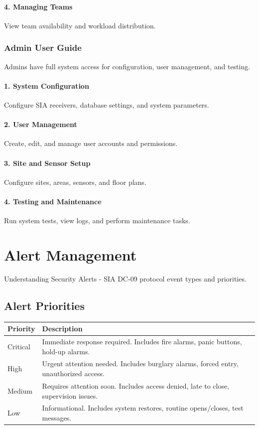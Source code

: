 \documentclass[12pt,a4paper]{article}
\begin{document}
\paragraph{4. Managing Teams}
View team availability and workload distribution.

\subsubsection{Admin User Guide}
Admins have full system access for configuration, user management, and testing.

\paragraph{1. System Configuration}
Configure SIA receivers, database settings, and system parameters.

\paragraph{2. User Management}
Create, edit, and manage user accounts and permissions.

\paragraph{3. Site and Sensor Setup}
Configure sites, areas, sensors, and floor plans.

\paragraph{4. Testing and Maintenance}
Run system tests, view logs, and perform maintenance tasks.

\section{Alert Management}

Understanding Security Alerts - SIA DC-09 protocol event types and priorities.

\subsection{Alert Priorities}

\begin{tabular}{|l|l|}
\hline
\textbf{Priority} & \textbf{Description} \\
\hline
Critical & Immediate response required. Includes fire alarms, panic buttons, hold-up alarms. \\
\hline
High & Urgent attention needed. Includes burglary alarms, forced entry, unauthorized access. \\
\hline
Medium & Requires attention soon. Includes access denied, late to close, supervision issues. \\
\hline
Low & Informational. Includes system restores, routine opens/closes, test messages. \\
\hline
\end{tabular}
\end{document}
